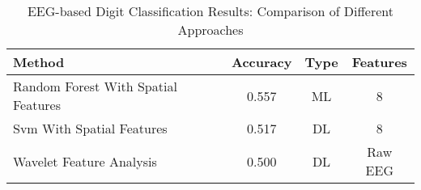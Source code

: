 
\begin{table}[htbp]
\centering
\caption{EEG-based Digit Classification Results: Comparison of Different Approaches}
\label{tab:eeg_results}
\begin{tabular}{|l|c|c|c|}
\hline
\textbf{Method} & \textbf{Accuracy} & \textbf{Type} & \textbf{Features} \\
\hline
Random Forest With Spatial Features & 0.557 & ML & 8 \\
\hline
Svm With Spatial Features & 0.517 & DL & 8 \\
\hline
Wavelet Feature Analysis & 0.500 & DL & Raw EEG \\
\hline
\end{tabular}
\end{table}
